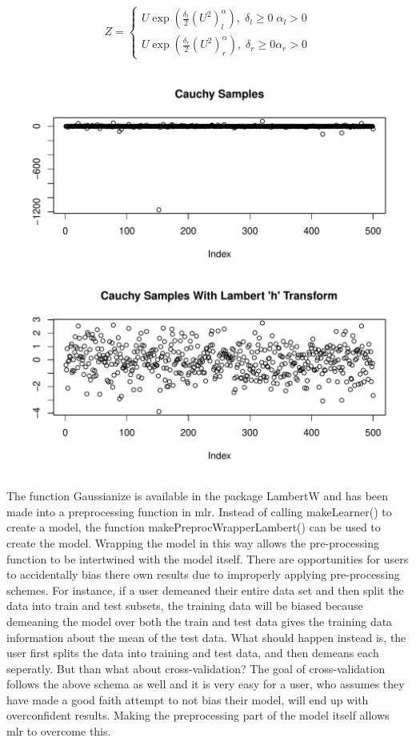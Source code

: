 \documentclass[12pt]{article}\usepackage[]{graphicx}\usepackage[]{color}
\makeatletter
\def\maxwidth{ %
  \ifdim\Gin@nat@width>\linewidth
    \linewidth
  \else
    \Gin@nat@width
  \fi
}
\newenvironment{knitrout}{}{} %
\theoremstyle{definition}
\newcommand\code{\@codex}
\def\@codex#1{{\normalfont\ttfamily\hyphenchar\font=-1 #1}}
\newcommand{\pkg}[1]{{\fontseries{b}\selectfont #1}}
\makeatother
\begin{document}
\begin{equation}
  Z = \begin{cases}
               U\exp\left(\frac{\delta_l}{2}(U^2)^\alpha_l\right),\; \delta_l \ge 0\; \alpha_l > 0\\
               U\exp\left(\frac{\delta_r}{2}(U^2)^\alpha_r\right),\; \delta_r \ge 0 \alpha_r > 0
            \end{cases}
\end{equation}

\singlespacing
\begin{knitrout}
\color{fgcolor}
\includegraphics[width=\maxwidth]{figure/lambertWplots-1} 

\end{knitrout}
\doublespacing

The function \code{Gaussianize} is available in the package \pkg{LambertW} and has been made into a preprocessing function in \pkg{mlr}. Instead of calling \code{makeLearner()} to create a model, the function \code{makePreprocWrapperLambert()} can be used to create the model. Wrapping the model in this way allows the pre-processing function to be intertwined with the model itself. There are opportunities for users to accidentally bias there own results due to improperly applying pre-processing schemes. For instance, if a user demeaned their entire data set and then split the data into train and test subsets, the training data will be biased because demeaning the model over both the train and test data gives the training data information about the mean of the test data. What should happen instead is, the user first splits the data into training and test data, and then demeans each seperatly. But than what about cross-validation? The goal of cross-validation follows the above schema as well and it is very easy for a user, who assumes they have made a good faith attempt to not bias their model, will end up with overconfident results. Making the preprocessing part of the model itself allows \pkg{mlr} to overcome this. 
\end{document}
